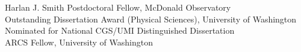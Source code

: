 Harlan J. Smith Postdoctoral Fellow, McDonald Observatory \\
Outstanding Dissertation Award (Physical Sciences), University of Washington 
\\
Nominated for National CGS/UMI Distinguished Dissertation 
\\
ARCS Fellow, University of Washington 

